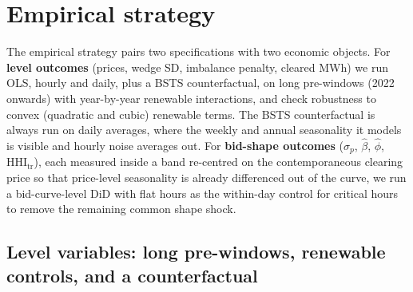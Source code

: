 \documentclass[11pt,a4paper]{article}
\theoremstyle{definition}
\theoremstyle{remark}
\theoremstyle{plain}
\begin{document}
\begin{center}
\label{tab:within-hour-gap}
\end{center}

\section{Empirical strategy}\label{sec:empirical}

The empirical strategy pairs two specifications with two economic objects. For \textbf{level outcomes} (prices, wedge SD, imbalance penalty, cleared MWh) we run OLS, hourly and daily, plus a BSTS counterfactual, on long pre-windows (2022 onwards) with year-by-year renewable interactions, and check robustness to convex (quadratic and cubic) renewable terms. The BSTS counterfactual is always run on daily averages, where the weekly and annual seasonality it models is visible and hourly noise averages out. 
 For \textbf{bid-shape outcomes} ($\sigma_p$, $\hat\beta$, $\hat\phi$, $\text{HHI}_{\text{tr}}$), each measured inside a band re-centred on the contemporaneous clearing price so that price-level seasonality is already differenced out of the curve, we run a bid-curve-level DiD with flat hours as the within-day control for critical hours to remove the remaining common shape shock.

\subsection{Level variables: long pre-windows, renewable controls, and a counterfactual}\label{sec:empirical:level}\label{sec:empirical:specA}
\end{document}
